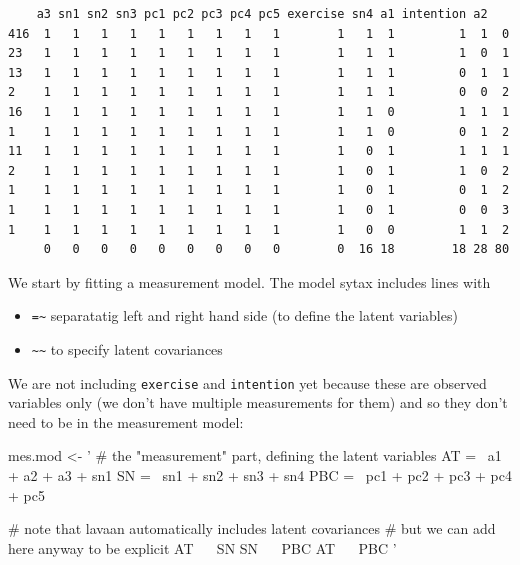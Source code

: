 \documentclass[]{article}
\newenvironment{Shaded}{\begin{snugshade}}{\end{snugshade}}
\newcommand{\NormalTok}[1]{#1}
\newcommand{\StringTok}[1]{\textcolor[rgb]{0.31,0.60,0.02}{#1}}
\providecommand{\tightlist}{%
  \setlength{\itemsep}{0pt}\setlength{\parskip}{0pt}}
\begin{document}
\begin{verbatim}
    a3 sn1 sn2 sn3 pc1 pc2 pc3 pc4 pc5 exercise sn4 a1 intention a2   
416  1   1   1   1   1   1   1   1   1        1   1  1         1  1  0
23   1   1   1   1   1   1   1   1   1        1   1  1         1  0  1
13   1   1   1   1   1   1   1   1   1        1   1  1         0  1  1
2    1   1   1   1   1   1   1   1   1        1   1  1         0  0  2
16   1   1   1   1   1   1   1   1   1        1   1  0         1  1  1
1    1   1   1   1   1   1   1   1   1        1   1  0         0  1  2
11   1   1   1   1   1   1   1   1   1        1   0  1         1  1  1
2    1   1   1   1   1   1   1   1   1        1   0  1         1  0  2
1    1   1   1   1   1   1   1   1   1        1   0  1         0  1  2
1    1   1   1   1   1   1   1   1   1        1   0  1         0  0  3
1    1   1   1   1   1   1   1   1   1        1   0  0         1  1  2
     0   0   0   0   0   0   0   0   0        0  16 18        18 28 80
\end{verbatim}

We start by fitting a measurement model. The model sytax includes lines with

\begin{itemize}
\tightlist
\item
  \texttt{=\textasciitilde{}} separatatig left and right hand side (to define the latent variables)
\item
  \texttt{\textasciitilde{}\textasciitilde{}} to specify latent covariances
\end{itemize}

We are not including \texttt{exercise} and \texttt{intention} yet because these are observed
variables only (we don't have multiple measurements for them) and so they don't
need to be in the measurement model:

\begin{Shaded}
\begin{Highlighting}[]
\NormalTok{mes.mod <-}\StringTok{ '}
\StringTok{  # the "measurement" part, defining the latent variables}
\StringTok{  AT =~ a1 + a2 + a3 + sn1}
\StringTok{  SN =~ sn1 + sn2 + sn3 + sn4}
\StringTok{  PBC =~ pc1 + pc2 + pc3 + pc4 + pc5}

\StringTok{  # note that lavaan automatically includes latent covariances}
\StringTok{  # but we can add here anyway to be explicit}
\StringTok{  AT ~~ SN}
\StringTok{  SN ~~ PBC}
\StringTok{  AT ~~ PBC}
\StringTok{'}
\end{Highlighting}
\end{Shaded}
\end{document}
